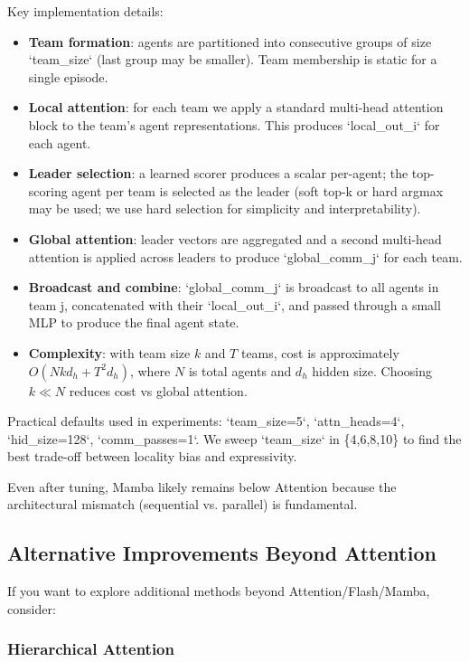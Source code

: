 Key implementation details:
\begin{itemize}
    \item \textbf{Team formation}: agents are partitioned into consecutive groups of size `team\_size` (last group may be smaller). Team membership is static for a single episode.
    \item \textbf{Local attention}: for each team we apply a standard multi-head attention block to the team's agent representations. This produces `local\_out_i` for each agent.
    \item \textbf{Leader selection}: a learned scorer produces a scalar per-agent; the top-scoring agent per team is selected as the leader (soft top-k or hard argmax may be used; we use hard selection for simplicity and interpretability).
    \item \textbf{Global attention}: leader vectors are aggregated and a second multi-head attention is applied across leaders to produce `global\_comm_j` for each team.
    \item \textbf{Broadcast and combine}: `global\_comm_j` is broadcast to all agents in team j, concatenated with their `local\_out_i`, and passed through a small MLP to produce the final agent state.
    \item \textbf{Complexity}: with team size $k$ and $T$ teams, cost is approximately $O(N k d_h + T^2 d_h)$, where $N$ is total agents and $d_h$ hidden size. Choosing $k \ll N$ reduces cost vs global attention.
\end{itemize}

Practical defaults used in experiments: `team_size=5`, `attn_heads=4`, `hid_size=128`, `comm_passes=1`. We sweep `team_size` in \{4,6,8,10\} to find the best trade-off between locality bias and expressivity.


Even after tuning, Mamba likely remains below Attention because the architectural mismatch (sequential vs. parallel) is fundamental.


\subsection{Alternative Improvements Beyond Attention}
\label{subsec:alternatives}

If you want to explore additional methods beyond Attention/Flash/Mamba, consider:

\subsubsection{Hierarchical Attention}

